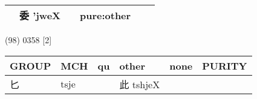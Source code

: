 \documentclass[14pt,a4paper]{scrartcl}
\begin{document}
\begin{longtable}[c]{@{}llllll@{}}
\begin{minipage}[t]{0.14\columnwidth}\raggedright\strut
\strut\end{minipage} &
\begin{minipage}[t]{0.14\columnwidth}\raggedright\strut
委 'jweX
\strut\end{minipage} &
\begin{minipage}[t]{0.14\columnwidth}\raggedright\strut
\strut\end{minipage} &
\begin{minipage}[t]{0.14\columnwidth}\raggedright\strut
pure:other
\strut\end{minipage}\tabularnewline
\bottomrule
\end{longtable}

(98) 0358 {[}2{]}

\begin{longtable}[c]{@{}llllll@{}}
\toprule
\begin{minipage}[b]{0.14\columnwidth}\raggedright\strut
GROUP
\strut\end{minipage} &
\begin{minipage}[b]{0.14\columnwidth}\raggedright\strut
MCH
\strut\end{minipage} &
\begin{minipage}[b]{0.14\columnwidth}\raggedright\strut
qu
\strut\end{minipage} &
\begin{minipage}[b]{0.14\columnwidth}\raggedright\strut
other
\strut\end{minipage} &
\begin{minipage}[b]{0.14\columnwidth}\raggedright\strut
none
\strut\end{minipage} &
\begin{minipage}[b]{0.14\columnwidth}\raggedright\strut
PURITY
\strut\end{minipage}\tabularnewline
\midrule
\endhead
\begin{minipage}[t]{0.14\columnwidth}\raggedright\strut
匕
\strut\end{minipage} &
\begin{minipage}[t]{0.14\columnwidth}\raggedright\strut
tsje
\strut\end{minipage} &
\begin{minipage}[t]{0.14\columnwidth}\raggedright\strut
\strut\end{minipage} &
\begin{minipage}[t]{0.14\columnwidth}\raggedright\strut
此 tshjeX
\strut\end{minipage} &
\begin{minipage}[t]{0.14\columnwidth}\raggedright\strut

\end{minipage}
\end{longtable}
\end{document}
